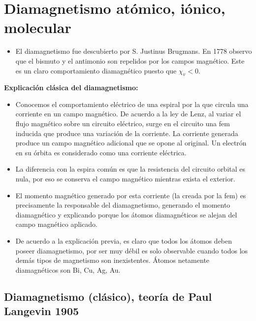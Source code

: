 \section{Diamagnetismo atómico, iónico, molecular}

\begin{itemize}
	\item El diamagnetismo fue descubierto por S. Justinus Brugmans. En 1778 observo que el bismuto y el antimonio son repelidos por los campos magnético. Este es un claro comportamiento diamagnético puesto que $\chi_{v}<0$.
\end{itemize}

\textbf{Explicación clásica del diamagnetismo:}

\begin{itemize}
	\item Conocemos el comportamiento eléctrico de una espiral por la que circula una corriente en un campo magnético. De acuerdo a la ley de Lenz, al variar el flujo magnético sobre un circuito eléctrico, surge en el circuito una fem inducida que produce una variación de la corriente. La corriente generada produce un campo magnético adicional que se opone al original. Un electrón en su órbita es considerado como una corriente eléctrica.
	\item La diferencia con la espira común es que la resistencia del circuito orbital es nula, por eso se conserva el campo magnético mientras exista el exterior.
	\item El momento magnético generado por esta corriente (la creada por la fem) es precisamente la responsable del diamagnetismo, generando el momento diamagnético y explicando porque los átomos diamagnéticos se alejan del campo magnético aplicado.
	\item De acuerdo a la explicación previa, es claro que todos los átomos deben poseer diamagnetismo, por ser muy débil es solo observable cuando todos los demás tipos de magnetismo son inexistentes. Átomos netamente diamagnéticos son Bi, Cu, Ag, Au.
\end{itemize}




\subsection{Diamagnetismo (clásico), teoría de Paul Langevin 1905}

